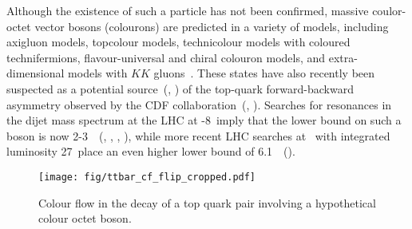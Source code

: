 Although the existence of such a particle has not been confirmed, massive coulor-octet vector bosons (colourons) are predicted in a variety of models, including axigluon models, topcolour models, technicolour models with coloured technifermions, flavour-universal and chiral colouron models, and extra-dimensional models with $KK$ gluons~\cite{Chivukula:2013xla}. These states have also recently been suspected as a potential source~(\cite{Ferrario:2009bz}, \cite{Frampton:2009rk}) of the top-quark forward-backward asymmetry observed by the CDF collaboration~(\cite{Aaltonen:2008hc}, \cite{Aaltonen:2011kc}). Searches for resonances in the dijet mass spectrum at the LHC at -8~\TeV imply that the lower bound on such a boson is now 2-3~\TeV~(\cite{Han:2010rf}, \cite{Haisch:2011up}, \cite{Chatrchyan:2011ns}, \cite{Aad:2011fq}), while more recent LHC searches at ~\TeV with integrated luminosity 27~\fbinv place an even higher lower bound of 6.1~\TeV~(\cite{CMS:2017xrr}).
  
  \begin{figure}[h!]
  \centering
  \texttt{[image: fig/ttbar\_cf\_flip\_cropped.pdf]}
  \caption{Colour flow in the decay of a top quark pair involving a hypothetical colour octet \PW boson.}
  \label{fig:ttbar_cf_octet}
\end{figure}

